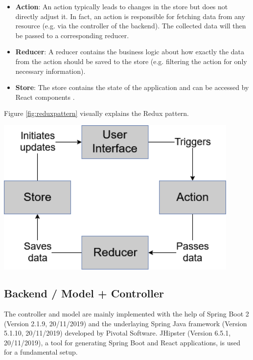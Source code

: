 \begin{minipage}{.5\linewidth}
	\begin{itemize}
		\item \textbf{Action}: An action typically leads to changes in the store but does not directly adjust it. In fact, an action is responsible for fetching data from any resource (e.g. via the controller of the backend). The collected data will then be passed to a corresponding reducer. \cite[p. 531-534]{freemanProReact162019}
		\item \textbf{Reducer}: A reducer contains the business logic about how exactly the data from the action should be saved to the store (e.g. filtering the action for only necessary information). \cite[p. 531-534]{freemanProReact162019}
		\item \textbf{Store}: The store contains the state of the application and can be accessed by React components \cite[p. 531-534]{freemanProReact162019}. 
	\end{itemize}
Figure \ref{fig:reduxpattern} visually explains the Redux pattern.
\end{minipage}
\hfill
\begin{minipage}{.5\linewidth}
	\centering
	\includegraphics[width=0.9\textwidth]{Content/Domain/ReduxPattern.png}
	\cite{own representation}
	\label{fig:reduxpattern}
\end{minipage}

\subsection{Backend / Model + Controller}
\label{sec:DomainCc}
The controller and model are mainly implemented with the help of Spring Boot 2 (Version 2.1.9, 20/11/2019) and the underlaying Spring Java framework (Version 5.1.10,  20/11/2019) developed by Pivotal Software. JHipster (Version 6.5.1, 20/11/2019), a tool for generating Spring Boot and React applications, is used for a fundamental setup.

